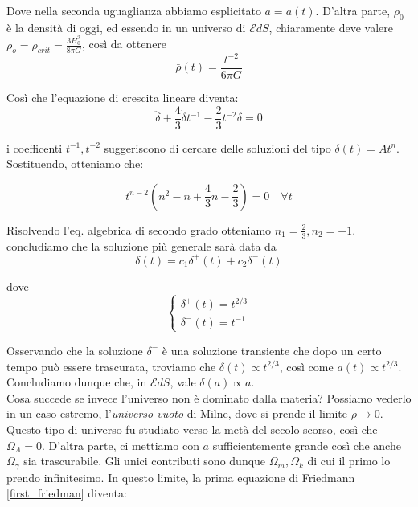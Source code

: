 \documentclass{report}
\begin{document}
Dove nella seconda uguaglianza abbiamo esplicitato $a=a(t)$. D'altra parte, $\rho_0$ è la densità di oggi, ed essendo in un universo di $\mathcal{E}dS$, chiaramente deve valere $\rho_o = \rho_{crit} = \frac{3H_0^2}{8\pi G}$, così da ottenere 
\begin{equation}
    \bar{\rho}(t) = \frac{t^{-2}}{6\pi G} 
\end{equation}

Così che l'equazione di crescita lineare diventa: 
\begin{equation}
    \ddot{\delta} + \frac{4}{3}\dot{\delta} t^{-1} -\frac{2}{3}t^{-2}\delta =0
\end{equation}

i coefficenti $t^{-1}, t^{-2}$ suggeriscono di cercare delle soluzioni del tipo $\delta(t) = At^n$. Sostituendo, otteniamo che: 

\begin{equation}
    t^{n-2}\left(n^2 - n +\frac{4}{3}n - \frac{2}{3}\right) = 0 \quad \forall t
\end{equation}

Risolvendo l'eq. algebrica di secondo grado otteniamo $n_1 = \frac{2}{3}, n_2 = -1$. \\

concludiamo che la soluzione più generale sarà data da 
\begin{equation}
    \delta(t) = c_1\delta^{+}(t) + c_2\delta^{-}(t)
\end{equation}

dove
\[\begin{cases}
    \delta^{+}(t) = t^{2/3} \\ \delta^{-}(t) = t^{-1}
\end{cases}\]

Osservando che la soluzione $\delta^{-}$ è una soluzione transiente che dopo un certo tempo può essere trascurata, troviamo che $\delta(t)\propto t^{2/3}$, così come $a(t) \propto t^{2/3}$. Concludiamo dunque che, in $\mathcal{E}dS$, vale $\delta(a) \propto a$. \\

Cosa succede se invece l'universo non è dominato dalla materia? Possiamo vederlo in un caso estremo, l'\emph{universo vuoto} di Milne, dove si prende il limite $\rho \rightarrow 0$. Questo tipo di universo fu studiato verso la metà del secolo scorso, così che $\Omega_\Lambda = 0$. D'altra parte, ci mettiamo con $a$ sufficientemente grande così che anche $\Omega_\gamma$ sia trascurabile. Gli unici contributi sono dunque $\Omega_m, \Omega_k$ di cui il primo lo prendo infinitesimo. In questo limite, la prima equazione di Friedmann \ref{first_friedman} diventa: 
\end{document}
